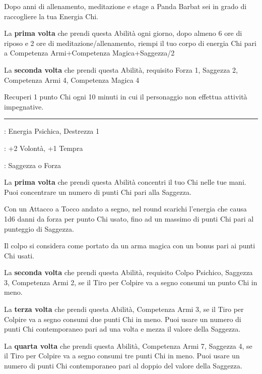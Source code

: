 \begin{multicols}{2}
Dopo anni di allenamento, meditazione e stage a Panda Barbat sei in grado di raccogliere la tua Energia Chi.

La \textbf{prima volta} che prendi questa Abilità ogni giorno, dopo almeno 6 ore di riposo e 2 ore di meditazione/allenamento, riempi il tuo corpo di energia Chi pari a Competenza Armi+Competenza Magica+Saggezza/2

La \textbf{seconda volta} che prendi questa Abilità, requisito Forza 1, Saggezza 2, Competenza Armi 4, Competenza Magica 4

Recuperi 1 punto Chi ogni 10 minuti in cui il personaggio non effettua attività impegnative.

\smallskip\noindent\rule{\linewidth}{2pt} \hypertarget{Colpo Psichico}{}\medskip{}
\noindent
\begin{description}[noitemsep, topsep=0pt, parsep=0pt, partopsep=0pt, leftmargin=0cm, labelwidth=2.5cm]
    \item[\textbf{Requisito}]: Energia Psichica, Destrezza 1
    \item[\textbf{Tiri Salvezza}]: +2 Volontà, +1 Tempra
    \item[\textbf{Caratteristica}]: Saggezza o Forza
\end{description}

La \textbf{prima volta} che prendi questa Abilità concentri il tuo Chi nelle tue mani. Puoi concentrare un numero di punti Chi pari alla Saggezza.

Con un Attacco a Tocco andato a segno, nel round scarichi l'energia che causa 1d6 danni da forza per punto Chi usato, fino ad un massimo di punti Chi pari al punteggio di Saggezza.

Il colpo si considera come portato da un arma magica con un bonus pari ai punti Chi usati.

La \textbf{seconda volta} che prendi questa Abilità, requisito Colpo Psichico, Saggezza 3, Competenza Armi 2, se il Tiro per Colpire va a segno consumi un punto Chi in meno.

La \textbf{terza volta} che prendi questa Abilità, Competenza Armi 3, se il Tiro per Colpire va a segno consumi due punti Chi in meno. Puoi usare un numero di punti Chi contemporaneo pari ad una volta e mezza il valore della Saggezza.

La \textbf{quarta volta} che prendi questa Abilità, Competenza Armi 7, Saggezza 4, se il Tiro per Colpire va a segno consumi tre punti Chi in meno. Puoi usare un numero di punti Chi contemporaneo pari al doppio del valore della Saggezza.


\end{multicols}
